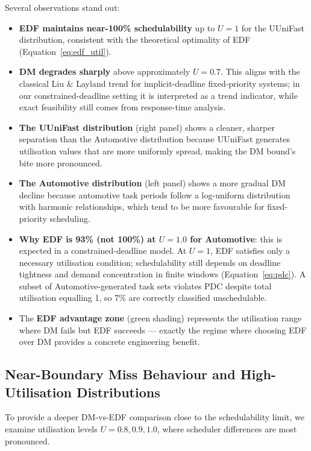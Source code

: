 \documentclass[12pt,a4paper]{article}
\begin{document}
Several observations stand out:

\begin{itemize}
    \item \textbf{EDF maintains near-100\% schedulability} up to \(U = 1\) for the UUniFast distribution, consistent with the theoretical optimality of EDF (Equation~\ref{eq:edf_util}).
    \item \textbf{DM degrades sharply} above approximately \(U = 0.7\). This aligns with the classical Liu \& Layland trend for implicit-deadline fixed-priority systems; in our constrained-deadline setting it is interpreted as a trend indicator, while exact feasibility still comes from response-time analysis.
    \item \textbf{The UUniFast distribution} (right panel) shows a cleaner, sharper separation than the Automotive distribution because UUniFast generates utilisation values that are more uniformly spread, making the DM bound's bite more pronounced.
    \item \textbf{The Automotive distribution} (left panel) shows a more gradual DM decline because automotive task periods follow a log-uniform distribution with harmonic relationships, which tend to be more favourable for fixed-priority scheduling.
    \item \textbf{Why EDF is 93\% (not 100\%) at \(U=1.0\) for Automotive}: this is expected in a constrained-deadline model. At \(U=1\), EDF satisfies only a necessary utilisation condition; schedulability still depends on deadline tightness and demand concentration in finite windows (Equation~\ref{eq:pdc}). A subset of Automotive-generated task sets violates PDC despite total utilisation equalling 1, so 7\% are correctly classified unschedulable.
    \item The \textbf{EDF advantage zone} (green shading) represents the utilisation range where DM fails but EDF succeeds --- exactly the regime where choosing EDF over DM provides a concrete engineering benefit.
\end{itemize}

\subsection{Near-Boundary Miss Behaviour and High-Utilisation Distributions}

To provide a deeper DM-vs-EDF comparison close to the schedulability limit, we examine utilisation levels \(U=0.8, 0.9, 1.0\), where scheduler differences are most pronounced.
\end{document}
